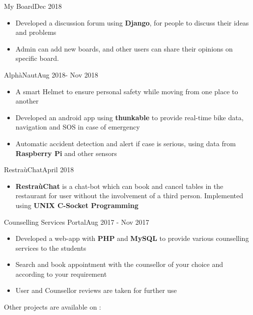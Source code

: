 
\begin{projects}
    \project
	{My Board}{Dec 2018}
	{}
	{
	    \begin{itemize}
	        \vspace{-5mm}
            \item Developed a discussion forum using \textbf{Django}, for people to discuss their ideas and problems
            \item Admin can add new boards, and other users can share their opinions on specific board.
        \end{itemize}
	}

	\project
	{AlphàNaut}{Aug 2018- Nov 2018}
	{}
	{
	    \begin{itemize}
	        \vspace{-5mm}
            \item A smart Helmet to ensure personal safety while moving from one place to another
            \item Developed an android app using \textbf{thunkable} to provide real-time bike data, navigation and SOS in case of emergency
            \item Automatic accident detection and alert if case is serious, using data from \textbf{Raspberry Pi} and other sensors
        \end{itemize}
	}
	
	\project
	{RestraùChat}{April 2018}
	{}
	{
	    \begin{itemize}
	        \vspace{-5mm}
            \item \textbf{RestraùChat} is a chat-bot which can book and cancel tables in the restaurant for user without the involvement of a third person. Implemented using \textbf{UNIX C-Socket Programming}
        \end{itemize}
	}
	
	\project
	{Counselling Services Portal}{Aug 2017 - Nov 2017}
	{}
	{
	    \begin{itemize}
	        \vspace{-5mm}
            \item Developed a web-app with \textbf{PHP} and \textbf{MySQL} to provide various counselling services to the students
            \item Search and book appointment with the counsellor of your choice and according to your requirement
            \item User and Counsellor reviews are taken for further use
        \end{itemize}
	}
\end{projects}
\vspace{-5mm}
Other projects are available on : 
